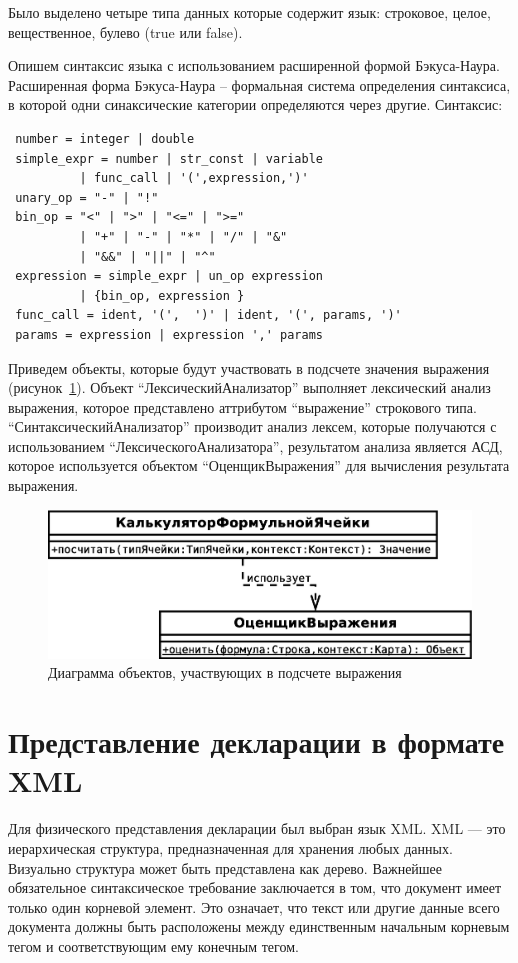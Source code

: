 \documentclass[14pt,a4paper]{reportmod}
\begin{document}
Было выделено четыре типа данных которые содержит язык: строковое, целое, вещественное, булево (true или false).

Опишем синтаксис языка с использованием расширенной формой Бэкуса-Наура. Расширенная форма Бэкуса-Наура -- формальная система определения синтаксиса, в которой одни синаксические категории определяются через другие. Синтаксис:

\begin{verbatim}
 number = integer | double
 simple_expr = number | str_const | variable
          | func_call | '(',expression,')'
 unary_op = "-" | "!"
 bin_op = "<" | ">" | "<=" | ">="
          | "+" | "-" | "*" | "/" | "&"
          | "&&" | "||" | "^"
 expression = simple_expr | un_op expression
          | {bin_op, expression }
 func_call = ident, '(',  ')' | ident, '(', params, ')'
 params = expression | expression ',' params
\end{verbatim}

Приведем объекты, которые будут участвовать в подсчете значения выражения (рисунок~\ref{pic:classes_4}).
Объект ``ЛексическийАнализатор'' выполняет лексический анализ выражения, которое представлено аттрибутом ``выражение'' строкового типа. ``СинтаксическийАнализатор'' производит анализ лексем, которые получаются с использованием ``ЛексическогоАнализатора'', результатом анализа является АСД, которое используется объектом ``ОценщикВыражения'' для вычисления результата выражения.

\begin{figure}
  \centering
  \includegraphics[scale=0.5]{uml/_classes_4}
  \caption{Диаграмма объектов, участвующих в подсчете выражения}
  \label{pic:classes_4}
\end{figure}

\section{Представление декларации в формате XML}
Для физического представления декларации был выбран язык XML. XML — это иерархическая структура, предназначенная для хранения любых данных. Визуально структура может быть представлена как дерево. Важнейшее обязательное синтаксическое требование заключается в том, что документ имеет только один корневой элемент. Это означает, что текст или другие данные всего документа должны быть расположены между единственным начальным корневым тегом и соответствующим ему конечным тегом.
\end{document}
